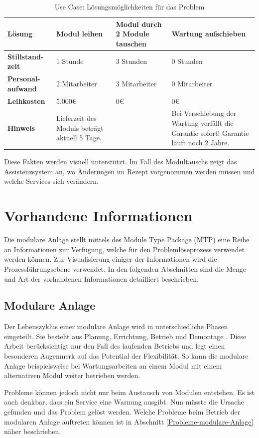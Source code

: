 \begin{table}[htbp]
\centering
\begin{tabular}{p{}|p{}|p{}|p{}|}
\textbf{Lösung} & Modul leihen & Modul durch 2 Module tauschen & Wartung aufschieben \\
\hline
\textbf{Stillstand-zeit} & 1 Stunde & 3 Stunden & 0 Stunden \\
\hline
\textbf{Personal-aufwand	} & 2 Mitarbeiter & 3 Mitarbeiter & 0 Mitarbeiter \\
\hline
\textbf{Leihkosten} & 5.000€ & 0€ & 0€ \\
\hline
\textbf{Hinweis} & Lieferzeit des Moduls beträgt aktuell 5 Tage. & & Bei Verschiebung der Wartung verfällt die Garantie sofort! Garantie läuft noch 2 Jahre. \\
\hline
\end{tabular}
\caption{Use Case: Lösungsmöglichkeiten für das Problem}
\label{tab:UseCase-Lösungen}
\end{table}
Diese Fakten werden visuell unterstützt. Im Fall des Modultauschs zeigt das Assistenzsystem an, wo Änderungen im Rezept vorgenommen werden müssen und welche Services sich verändern.

\section{Vorhandene Informationen}
Die modulare Anlage stellt mittels des Module Type Package (MTP) eine Reihe an Informationen zur Verfügung, welche für den Problemlöseprozess verwendet werden können. Zur Visualisierung einiger der Informationen wird die Prozessführungsebene verwendet. In den folgenden Abschnitten sind die Menge und Art der vorhandenen Informationen detailliert beschrieben. 

\subsection{Modulare Anlage}
Der Lebenszyklus einer modulare Anlage wird in unterschiedliche Phasen eingeteilt. Sie besteht aus Planung, Errichtung, Betrieb und Demontage \cite{Obst2013}. Diese Arbeit berücksichtigt nur den Fall des laufenden Betriebs und legt einen besonderen Augenmerk auf das Potential der Flexibilität. So kann die modulare Anlage beispielsweise bei Wartungsarbeiten an einem Modul mit einem alternativen Modul weiter betrieben werden.

Probleme können jedoch nicht nur beim Austausch von Modulen entstehen. Es ist auch denkbar, dass ein Service eine Warnung ausgibt. Nun müsste die Ursache gefunden und das Problem gelöst werden. Welche Probleme beim Betrieb der modularen Anlage auftreten können ist in Abschnitt \ref{Probleme-modulare-Anlage} näher beschrieben.

